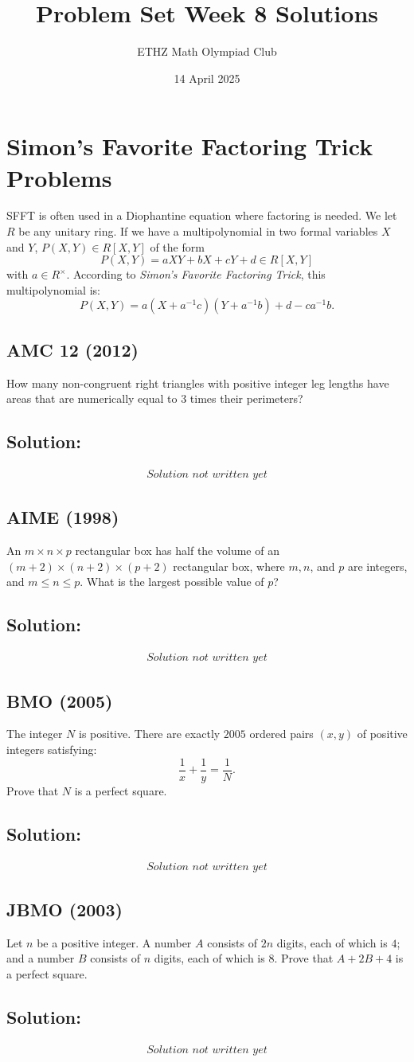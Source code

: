 \documentclass[11pt, a4paper, oneside]{article}
\title{Problem Set Week 8 Solutions}
\author{ETHZ Math Olympiad Club}
\date{14 April 2025}
\newcommand{\problem}[1][]{\section{#1} \hfill \par}
\newcommand{\solution}[1][]{\subsection*{#1}\hfill \par}
\theoremstyle{remark}
\theoremstyle{lemma}
\begin{document}
\maketitle

\problem[Simon's Favorite Factoring Trick Problems] 
SFFT is often used in a Diophantine equation where factoring is needed. We let \( R \) be any unitary ring. If we have a multipolynomial in two formal variables \( X \) and \( Y \), \( P(X,Y) \in R[X,Y] \) of the form 
\[
P(X,Y) = aXY + bX + cY + d \in R[X,Y]
\] 
with \( a \in R^{\times} \). According to \textit{Simon's Favorite Factoring Trick}, this multipolynomial is:
\[
P(X,Y) = a\left(X + a^{-1}c\right)\left(Y + a^{-1}b\right) + d - ca^{-1}b.
\]

\subsection{AMC 12 (2012)} 
How many non-congruent right triangles with positive integer leg lengths have areas that are numerically equal to \( 3 \) times their perimeters?
\solution[Solution:]
\[
\substack{\textit{Solution not written yet}}
\]
\subsection{AIME (1998)} 
An \( m \times n \times p \) rectangular box has half the volume of an \( (m+2) \times (n+2) \times (p+2) \) rectangular box, where \( m, n \), and \( p \) are integers, and \( m \leq n \leq p \). What is the largest possible value of \( p \)?
\solution[Solution:]
\[
\substack{\textit{Solution not written yet}}
\]
\subsection{BMO (2005)} 
The integer \( N \) is positive. There are exactly \( 2005 \) ordered pairs \( (x,y) \) of positive integers satisfying:
\[
\frac{1}{x} + \frac{1}{y} = \frac{1}{N}.
\]
Prove that \( N \) is a perfect square.
\solution[Solution:]
\[
\substack{\textit{Solution not written yet}}
\]
\subsection{JBMO (2003)} 
Let \( n \) be a positive integer. A number \( A \) consists of \( 2n \) digits, each of which is \( 4 \); and a number \( B \) consists of \( n \) digits, each of which is \( 8 \). Prove that \( A + 2B + 4 \) is a perfect square.
\solution[Solution:]
\[
\substack{\textit{Solution not written yet}}
\]
\end{document}
